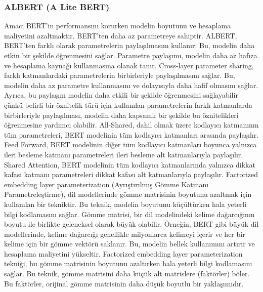 \subsubsection{ALBERT (A Lite BERT)}
Amacı BERT'in performansını korurken modelin boyutunu ve hesaplama maliyetini azaltmaktır. BERT'ten daha az parametreye sahiptir. ALBERT, BERT'ten farklı olarak parametrelerin paylaşılmasını kullanır. Bu, modelin daha etkin bir şekilde öğrenmesini sağlar. Parametre paylaşımı, modelin daha az hafıza ve hesaplama kaynağı kullanmasına olanak tanır. Cross-layer parameter sharing, farklı katmanlardaki parametrelerin birbirleriyle paylaşılmasını sağlar. Bu, modelin daha az parametre kullanmasını ve dolayısıyla daha hafif olmasını sağlar. Ayrıca, bu paylaşım modelin daha etkili bir şekilde öğrenmesini sağlayabilir çünkü belirli bir öznitelik türü için kullanılan parametrelerin farklı katmanlarda birbirleriyle paylaşılması, modelin daha kapsamlı bir şekilde bu öznitelikleri öğrenmesine yardımcı olabilir.  All-Shared, dahil olmak üzere kodlayıcı katmanının tüm parametreleri, BERT modelinin tüm kodlayıcı katmanları arasında paylaşılır. Feed Forward, BERT modelinin diğer tüm kodlayıcı katmanları boyunca yalnızca ileri besleme katmanı parametreleri ileri besleme alt katmanlarıyla paylaşılır. Shared Attention, BERT modelinin tüm kodlayıcı katmanlarında yalnızca dikkat kafası katmanı parametreleri dikkat kafası alt katmanlarıyla paylaşılır.  Factorized embedding layer parameterization (Ayrıştırılmış Gömme Katmanı Parametreleştirme), dil modellerinde gömme matrisinin boyutunu azaltmak için kullanılan bir tekniktir. Bu teknik, modelin boyutunu küçültürken hala yeterli bilgi kodlamasını sağlar. Gömme matrisi, bir dil modelindeki kelime dağarcığının boyutu ile birlikte geleneksel olarak büyük olabilir. Örneğin, BERT gibi büyük dil modellerinde, kelime dağarcığı genellikle milyonlarca kelimeyi içerir ve her bir kelime için bir gömme vektörü saklanır. Bu, modelin bellek kullanımını artırır ve hesaplama maliyetini yükseltir. Factorized embedding layer parameterization tekniği, bu gömme matrisinin boyutunu azaltırken hala yeterli bilgi kodlamasını sağlar. Bu teknik, gömme matrisini daha küçük alt matrislere (faktörler) böler. Bu faktörler, orijinal gömme matrisinin daha düşük boyutlu bir yaklaşımıdır.

